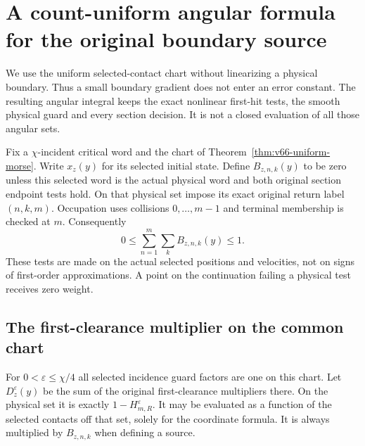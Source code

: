 \section{A count-uniform angular formula for the original boundary source}
\label{sec:v66-physical-angular}
We use the uniform selected-contact chart without linearizing a physical
boundary. Thus a small boundary gradient does not enter an error
constant. The resulting angular integral keeps the exact nonlinear
first-hit tests, the smooth physical guard and every section decision.
It is not a closed evaluation of all those angular sets.

Fix a $\chi$-incident critical word and the chart of
Theorem~\ref{thm:v66-uniform-morse}. Write $x_z(y)$ for its selected
initial state. Define $B_{z,n,k}(y)$ to be zero unless this selected
word is the actual physical word and both original section endpoint
tests hold. On that physical set impose its exact original return
label $(n,k,m)$. Occupation uses collisions $0,\ldots,m-1$ and
terminal membership is checked at $m$. Consequently
\begin{equation}\label{eq:v66-exact-label-partition}
 0\le\sum_{n=1}^m\sum_k B_{z,n,k}(y)\le1.
\end{equation}
These tests are made on the actual selected positions and velocities,
not on signs of first-order approximations. A point on the continuation
failing a physical test receives zero weight.

\subsection{The first-clearance multiplier on the common chart}
For $0<\varepsilon\le\chi/4$ all selected incidence guard factors
are one on this chart. Let $D_z^\varepsilon(y)$ be the sum of the
original first-clearance multipliers there. On the physical set it is
exactly $1-H_{m,R}^\varepsilon$. It may be evaluated as a function
of the selected contacts off that set, solely for the coordinate
formula. It is always multiplied by $B_{z,n,k}$ when defining a source.

